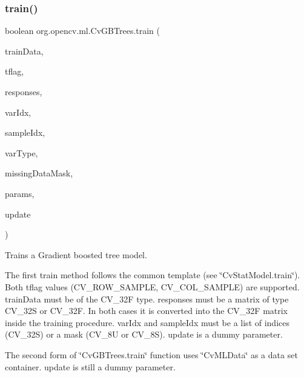 \subsubsection{\texorpdfstring{train()}{train()}\hspace{0.1cm}{\footnotesize\ttfamily [1/2]}}
{\footnotesize\ttfamily boolean org.\+opencv.\+ml.\+Cv\+G\+B\+Trees.\+train (\begin{DoxyParamCaption}\item[{\mbox{\hyperlink{classorg_1_1opencv_1_1core_1_1_mat}{Mat}}}]{train\+Data,  }\item[{int}]{tflag,  }\item[{\mbox{\hyperlink{classorg_1_1opencv_1_1core_1_1_mat}{Mat}}}]{responses,  }\item[{\mbox{\hyperlink{classorg_1_1opencv_1_1core_1_1_mat}{Mat}}}]{var\+Idx,  }\item[{\mbox{\hyperlink{classorg_1_1opencv_1_1core_1_1_mat}{Mat}}}]{sample\+Idx,  }\item[{\mbox{\hyperlink{classorg_1_1opencv_1_1core_1_1_mat}{Mat}}}]{var\+Type,  }\item[{\mbox{\hyperlink{classorg_1_1opencv_1_1core_1_1_mat}{Mat}}}]{missing\+Data\+Mask,  }\item[{\mbox{\hyperlink{classorg_1_1opencv_1_1ml_1_1_cv_g_b_trees_params}{Cv\+G\+B\+Trees\+Params}}}]{params,  }\item[{boolean}]{update }\end{DoxyParamCaption})}

Trains a Gradient boosted tree model.

The first train method follows the common template (see \char`\"{}\+Cv\+Stat\+Model.\+train\char`\"{}). Both {\ttfamily tflag} values ({\ttfamily C\+V\+\_\+\+R\+O\+W\+\_\+\+S\+A\+M\+P\+LE}, {\ttfamily C\+V\+\_\+\+C\+O\+L\+\_\+\+S\+A\+M\+P\+LE}) are supported. {\ttfamily train\+Data} must be of the {\ttfamily C\+V\+\_\+32F} type. {\ttfamily responses} must be a matrix of type {\ttfamily C\+V\+\_\+32S} or {\ttfamily C\+V\+\_\+32F}. In both cases it is converted into the {\ttfamily C\+V\+\_\+32F} matrix inside the training procedure. {\ttfamily var\+Idx} and {\ttfamily sample\+Idx} must be a list of indices ({\ttfamily C\+V\+\_\+32S}) or a mask ({\ttfamily C\+V\+\_\+8U} or {\ttfamily C\+V\+\_\+8S}). {\ttfamily update} is a dummy parameter.

The second form of \char`\"{}\+Cv\+G\+B\+Trees.\+train\char`\"{} function uses \char`\"{}\+Cv\+M\+L\+Data\char`\"{} as a data set container. {\ttfamily update} is still a dummy parameter.

